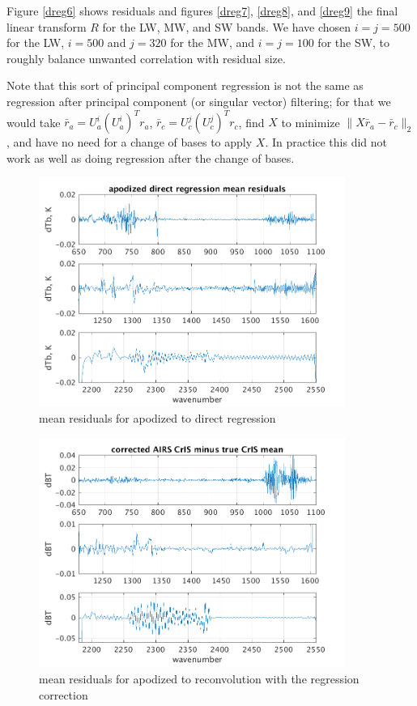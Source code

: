 \documentclass[11pt]{article}
\begin{document}
Figure \ref{dreg6} shows residuals and figures \ref{dreg7},
\ref{dreg8}, and \ref{dreg9} the final linear transform $R$ for the
{\cris} LW, MW, and SW bands.  We have chosen $i = j = 500$ for the
LW, $i = 500$ and $j = 320$ for the MW, and $i = j = 100$ for the SW,
to roughly balance unwanted correlation with residual size.

Note that this sort of principal component regression is not the 
same as regression after principal component (or singular vector)
filtering; for that we would take $\bar r_a = U_a^i (U_a^i)^T r_a$,
$\bar r_c = U_c^j (U_c^j)^T r_c$, find $X$ to minimize $\|X \bar r_a
- \bar r_c\|_2$, and have no need for a change of bases to apply $X$.
In practice this did not work as well as doing regression after the
change of bases.

\begin{figure} %
  \centering
  \includegraphics[height=7.5cm]{slackfigs/ap_direct_regr.png}
  \caption{mean residuals for apodized {\airs} to {\cris} direct
    regression}
  \label{dreg1}
\end{figure}

\begin{figure} %
  \centering
  \includegraphics[height=7.5cm]{slackfigs/ap_decon_corr.png}
  \caption{mean residuals for apodized {\airs} to {\cris}
    reconvolution with the regression correction}
  \label{dreg2}
\end{figure}
\end{document}
